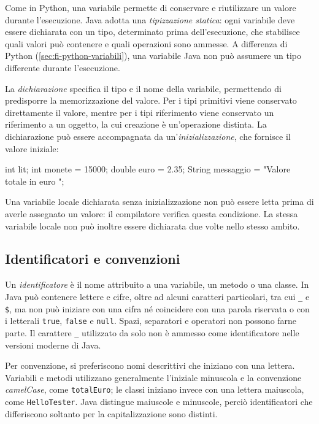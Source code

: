 Come in Python, una variabile permette di conservare e riutilizzare
un valore durante l'esecuzione. Java adotta una
\emph{tipizzazione statica}: ogni variabile deve essere dichiarata
con un tipo, determinato prima dell'esecuzione, che stabilisce
quali valori può contenere e quali operazioni sono ammesse.
A differenza di Python (\cref{sec:fi-python-variabili}),
una variabile Java non può assumere un tipo differente
durante l'esecuzione.

La \emph{dichiarazione} specifica il tipo e il nome della variabile,
permettendo di predisporre la memorizzazione del valore.
Per i tipi primitivi viene conservato direttamente il valore,
mentre per i tipi riferimento viene conservato un riferimento
a un oggetto, la cui creazione è un'operazione distinta.
La dichiarazione può essere accompagnata da
un'\emph{inizializzazione}, che fornisce il valore iniziale:

\begin{unipdcode}[language=Java]
int lit;
int monete = 15000;
double euro = 2.35;
String messaggio = "Valore totale in euro ";
\end{unipdcode}

Una variabile locale dichiarata senza inizializzazione non può
essere letta prima di averle assegnato un valore:
il compilatore verifica questa condizione. La stessa variabile
locale non può inoltre essere dichiarata due volte nello
stesso ambito.

\subsection{Identificatori e convenzioni}
\label{sec:fi-java-identificatori}

Un \emph{identificatore} è il nome attribuito a una variabile,
un metodo o una classe. In Java può contenere lettere e cifre,
oltre ad alcuni caratteri particolari, tra cui \texttt{\_}
e \texttt{\$}, ma non può iniziare con una cifra né coincidere
con una parola riservata o con i letterali
\texttt{true}, \texttt{false} e \texttt{null}.
Spazi, separatori e operatori non possono farne parte.
Il carattere \texttt{\_} utilizzato da solo non è ammesso
come identificatore nelle versioni moderne di Java.

Per convenzione, si preferiscono nomi descrittivi che iniziano
con una lettera. Variabili e metodi utilizzano generalmente
l'iniziale minuscola e la convenzione \emph{camelCase},
come \texttt{totalEuro}; le classi iniziano invece con
una lettera maiuscola, come \texttt{HelloTester}.
Java distingue maiuscole e minuscole, perciò identificatori
che differiscono soltanto per la capitalizzazione sono distinti.

